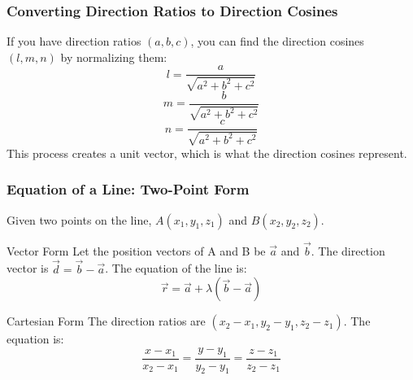 \begin{frame}
    \frametitle{Converting Direction Ratios to Direction Cosines}
    If you have direction ratios \((a, b, c)\), you can find the direction cosines \((l, m, n)\) by normalizing them:
    \[ l = \frac{a}{\sqrt{a^2 + b^2 + c^2}} \]
    \[ m = \frac{b}{\sqrt{a^2 + b^2 + c^2}} \]
    \[ n = \frac{c}{\sqrt{a^2 + b^2 + c^2}} \]
    This process creates a unit vector, which is what the direction cosines represent.
\end{frame}

\begin{frame}
    \frametitle{Equation of a Line: Two-Point Form}
    Given two points on the line, \(A(x_1, y_1, z_1)\) and \(B(x_2, y_2, z_2)\).
    \begin{block}{Vector Form}
        Let the position vectors of A and B be \(\vec{a}\) and \(\vec{b}\). The direction vector is \(\vec{d} = \vec{b} - \vec{a}\). The equation of the line is:
        \[ \vec{r} = \vec{a} + \lambda(\vec{b} - \vec{a}) \]
    \end{block}
    \begin{block}{Cartesian Form}
        The direction ratios are \((x_2 - x_1, y_2 - y_1, z_2 - z_1)\). The equation is:
        \[ \frac{x - x_1}{x_2 - x_1} = \frac{y - y_1}{y_2 - y_1} = \frac{z - z_1}{z_2 - z_1} \]
    \end{block}
\end{frame}




